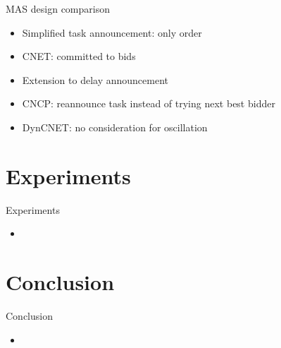 \documentclass{beamer}
\begin{document}
	\begin{frame}{MAS design comparison}
		\begin{itemize}
			\item Simplified task announcement: only order
			\item CNET: committed to bids
			\item Extension to delay announcement
			\item CNCP: reannounce task instead of trying next best bidder
			\item DynCNET: no consideration for oscillation
		\end{itemize}
	\end{frame}
	
	\section{Experiments}
	\begin{frame}{Experiments}
		\begin{itemize}
			\item
		\end{itemize}
	\end{frame}
	
	\section{Conclusion}
	\begin{frame}{Conclusion}
		\begin{itemize}
			\item
		\end{itemize}
	\end{frame}
	
\end{document}
